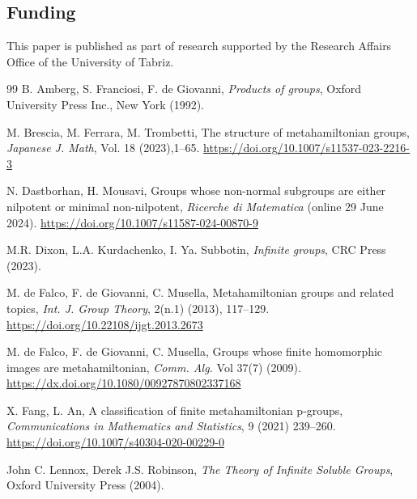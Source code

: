 \documentclass[11pt]{amsart}
\begin{document}
\subsection*{Funding }This paper is published as part of research supported by the Research Affairs Office of the University of Tabriz.

\begin{thebibliography}{99}
B. Amberg, S. Franciosi, F. de Giovanni, \emph{Products of groups},  Oxford University Press Inc., New York (1992).


 M. Brescia, M. Ferrara, M. Trombetti, The structure of metahamiltonian groups, \emph{Japanese J. Math}, Vol. 18 (2023),1–65. \href{https://doi.org/10.1007/s11537-023-2216-3}{https://doi.org/10.1007/s11537-023-2216-3}

 N. Dastborhan, H. Mousavi, Groups whose non-normal subgroups are either nilpotent or minimal non-nilpotent, \emph{Ricerche di Matematica} (online 29 June 2024). \href{https://doi.org/10.1007/s11587-024-00870-9}{https://doi.org/10.1007/s11587-024-00870-9}

  M.R. Dixon, L.A. Kurdachenko, I. Ya. Subbotin,  \emph{Infinite groups}, CRC Press (2023).

  M. de Falco, F. de Giovanni, C. Musella, Metahamiltonian groups and related topics, \emph{Int. J. Group Theory}, 2(n.1) (2013), 117–129. \href{https://doi.org/10.22108/ijgt.2013.2673}{https://doi.org/10.22108/ijgt.2013.2673}

M. de Falco, F. de Giovanni, C. Musella, Groups whose finite homomorphic images are metahamiltonian, \emph{Comm. Alg.} Vol 37(7) (2009).
\href{https://dx.doi.org/10.1080/00927870802337168}{https://dx.doi.org/10.1080/00927870802337168}

 X. Fang, L. An, A classification of finite metahamiltonian p-groups, \emph{Communications in Mathematics and Statistics}, 9 (2021) 239–260. \href{https://doi.org/10.1007/s40304-020-00229-0}{https://doi.org/10.1007/s40304-020-00229-0}

 John C. Lennox,  Derek  J.S. Robinson, \emph {The Theory of  Infinite Soluble Groups}, Oxford University Press (2004).


\end{thebibliography}
\end{document}
